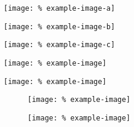 \documentclass{article}
\let\vamaxheight\relax
\newlength{%
		\vamaxheight}
\begin{document}
\begin{verticallyaligned}
	\noindent
	\begin{minipage}[b][\vamaxheight][b]{%
			.30\textwidth}
		\centering
		\texttt{[image: \%
			example-image-a]}
	\end{minipage}
	\hfill
	\begin{minipage}[b][\vamaxheight][t]{%
			.10\textwidth}
		\centering
		\texttt{[image: \%
			example-image-b]}
	\end{minipage}
	\hfill
	\begin{minipage}[b][\vamaxheight][t]{%
			.20\textwidth}
		\centering
		\texttt{[image: \%
			example-image-c]}
	\end{minipage}
	\hfill
	\begin{minipage}[b][\vamaxheight][c]{%
			.20\textwidth}
		\centering
		\texttt{[image: \%
			example-image]}
	\end{minipage}
	\hfill
	\begin{minipage}[b][\vamaxheight][t]{%
			.20\textwidth}
		\centering
		\texttt{[image: \%
			example-image]}
	\end{minipage}
\end{verticallyaligned}

\lipsum[1]

\begin{figure}
	\begin{verticallyaligned}
		\noindent
		\begin{minipage}[b][\vamaxheight][c]{%
				.50\textwidth}
			\centering
			\texttt{[image: \%
				example-image]}
			\caption{%
			}
		\end{minipage}
		\hfill
		\begin{minipage}[b][\vamaxheight][t]{%
				.40\textwidth}
			\centering
			\texttt{[image: \%
				example-image]}
			\caption{%
			}
		\end{minipage}
	\end{verticallyaligned}
	\caption{%
	}
\end{figure}
\end{document}
